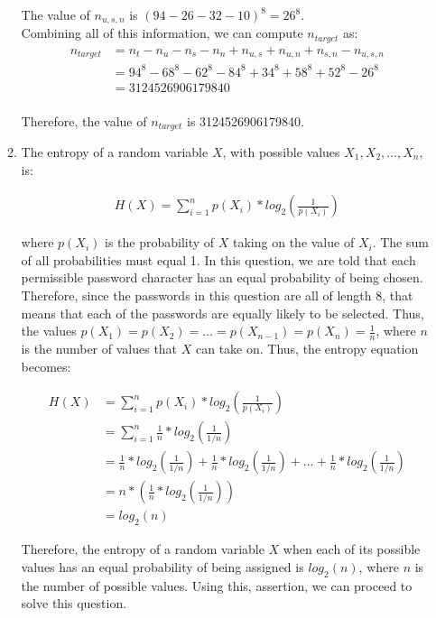 \documentclass[11pt]{article}
\theoremstyle{definition}
\begin{document}
\begin{enumerate}
\begin{enumerate}
The value of $n_{u,s,n}$ is $(94 - 26 - 32 - 10)^8  = 26^8$.\\

Combining all of this information, we can compute $n_{target}$ as:
\begin{align*}
n_{target} &= n_{t} - n_{u} - n_{s} - n_{n} + n_{u,s} + n_{u,n} + n_{s,n} - n_{u,s,n}\\
&= 94^8 - 68^8 - 62^8 - 84^8 + 34^8 + 58^8 + 52^8 - 26^8\\
&= 3124526906179840
\end{align*}
\\Therefore, the value of $n_{target}$ is 3124526906179840.\\

\item The entropy of a random variable $X$, with possible values $X_1, X_2, \ldots, X_n$, is:

\begin{align*}
H(X) = \sum_{i=1}^{n} p(X_i) * log_2(\frac{1}{p(X_i)})
\end{align*}

where $p(X_i)$ is the probability of $X$ taking on the value of $X_i$. The sum of all probabilities must equal 1. In this question, we are told that each permissible password character has an
equal probability of being chosen. Therefore, since the passwords in this question are all of length 8, that means that each of the passwords are equally likely to be selected. Thus, the values
$p(X_1) = p(X_2) = \ldots = p(X_{n-1}) = p(X_n) = \frac{1}{n}$, where $n$ is the number of values that $X$ can take on. Thus, the entropy equation becomes:

\begin{align*}
H(X) &= \sum_{i=1}^{n} p(X_i) * log_2(\frac{1}{p(X_i)})\\
&= \sum_{i=1}^{n} \frac{1}{n} * log_2(\frac{1}{1/n})\\
&= \frac{1}{n} * log_2(\frac{1}{1/n}) + \frac{1}{n} * log_2(\frac{1}{1/n}) + \ldots + \frac{1}{n} * log_2(\frac{1}{1/n})\\
&= n * (\frac{1}{n} * log_2(\frac{1}{1/n}))\\
&= log_2(n)
\end{align*}

Therefore, the entropy of a random variable $X$ when each of its possible values has an equal probability of being assigned is $log_2(n)$, where $n$ is the number of possible values. Using this,
assertion, we can proceed to solve this question.


\end{enumerate}
\end{enumerate}
\end{document}
